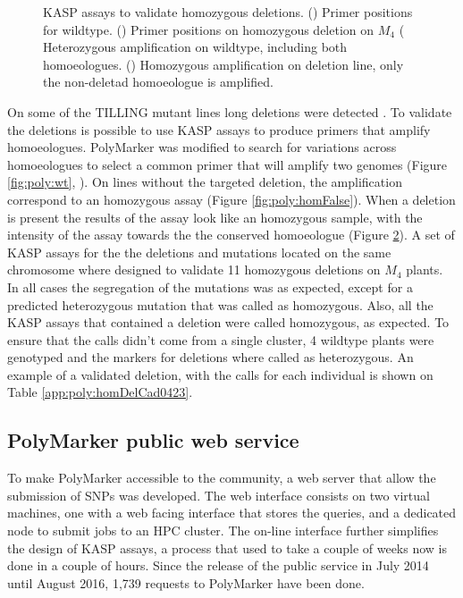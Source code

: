 \begin{figure}
\begin{subfigure}[b]{0.3\textwidth}
        \label{fig:poly:homReal}
    \end{subfigure}
    \caption{KASP assays to validate homozygous deletions. () Primer positions for wildtype. () Primer positions on  homozygous deletion on $M_{4}$ ( Heterozygous amplification on wildtype, including both homoeologues. () Homozygous amplification on deletion line, only the non-deletad homoeologue is amplified. }
\end{figure}

On some of the TILLING mutant lines long deletions were detected \citep{Krasileva2016}.
To validate the deletions is possible to use KASP assays to produce primers that amplify homoeologues.  
PolyMarker was modified to search for variations across homoeologues to select a common primer that will amplify two genomes (Figure \ref{fig:poly:wt}, ). 
On lines without the targeted deletion, the amplification correspond to an homozygous assay (Figure \ref{fig:poly:homFalse}).  
When a deletion is present the results of the assay look like an homozygous sample, with the intensity of the assay towards the the conserved homoeologue (Figure \ref{fig:poly:homReal}).
A set of KASP assays for the the deletions and mutations located on the same chromosome where designed to validate 11 homozygous deletions on $M_{4}$ plants. 
In all cases the segregation of the mutations was as expected, except for a predicted heterozygous mutation that was called as homozygous. 
Also, all the KASP assays that contained a deletion were called homozygous, as expected. 
To ensure that the calls didn't come from a single cluster, 4 wildtype plants were genotyped and the markers for deletions where called as heterozygous. 
An example of a validated deletion, with the calls for each individual is shown on Table \ref{app:poly:homDelCad0423}.

\subsection{PolyMarker public web service}
To make PolyMarker accessible to the community, a web server that allow the submission of SNPs was developed. 
The web interface consists on two virtual machines, one with a web facing interface that stores the queries, and a dedicated node to submit jobs to an HPC cluster.
The on-line interface further simplifies the design of KASP assays, a process that used to take a couple of weeks now is done in a couple of hours. 
Since the release of the public service in July 2014 until August 2016, 1,739 requests to PolyMarker have been done. 


